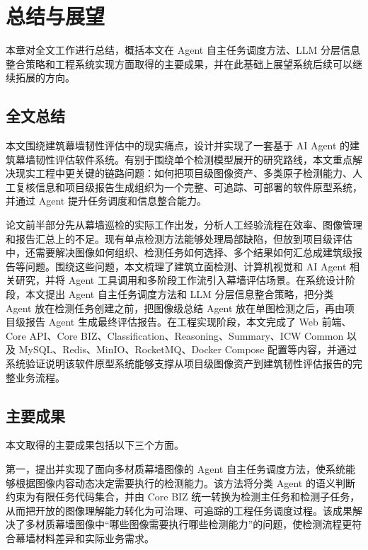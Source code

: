 \chapter{总结与展望}
\label{chap:conclusion}

本章对全文工作进行总结，概括本文在 Agent 自主任务调度方法、LLM 分层信息整合策略和工程系统实现方面取得的主要成果，并在此基础上展望系统后续可以继续拓展的方向。

\section{全文总结}
\label{sec:conclusion-full-text-summary}

本文围绕建筑幕墙韧性评估中的现实痛点，设计并实现了一套基于 AI Agent 的建筑幕墙韧性评估软件系统。有别于围绕单个检测模型展开的研究路线，本文重点解决现实工程中更关键的链路问题：如何把项目级图像资产、多类原子检测能力、人工复核信息和项目级报告生成组织为一个完整、可追踪、可部署的软件原型系统，并通过 Agent 提升任务调度和信息整合能力。

论文前半部分先从幕墙巡检的实际工作出发，分析人工经验流程在效率、图像管理和报告汇总上的不足。现有单点检测方法能够处理局部缺陷，但放到项目级评估中，还需要解决图像如何组织、检测任务如何选择、多个结果如何汇总成建筑级报告等问题。围绕这些问题，本文梳理了建筑立面检测、计算机视觉和 AI Agent 相关研究，并将 Agent 工具调用和多阶段工作流引入幕墙评估场景。在系统设计阶段，本文提出 Agent 自主任务调度方法和 LLM 分层信息整合策略，把分类 Agent 放在检测任务创建之前，把图像级总结 Agent 放在单图检测之后，再由项目级报告 Agent 生成最终评估报告。在工程实现阶段，本文完成了 Web 前端、Core API、Core BIZ、Classification、Reasoning、Summary、ICW Common 以及 MySQL、Redis、MinIO、RocketMQ、Docker Compose 配置等内容，并通过系统验证说明该软件原型系统能够支撑从项目级图像资产到建筑韧性评估报告的完整业务流程。

\section{主要成果}
\label{sec:conclusion-main-results}

本文取得的主要成果包括以下三个方面。

第一，提出并实现了面向多材质幕墙图像的 Agent 自主任务调度方法，使系统能够根据图像内容动态决定需要执行的检测能力。该方法将分类 Agent 的语义判断约束为有限任务代码集合，并由 Core BIZ 统一转换为检测主任务和检测子任务，从而把开放的图像理解能力转化为可治理、可追踪的工程任务调度过程。该成果解决了多材质幕墙图像中“哪些图像需要执行哪些检测能力”的问题，使检测流程更符合幕墙材料差异和实际业务需求。

